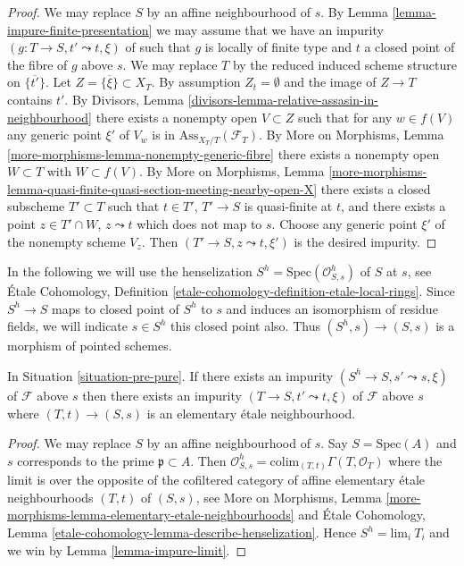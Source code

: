 \begin{proof}
We may replace $S$ by an affine neighbourhood of $s$. By
Lemma \ref{lemma-impure-finite-presentation}
we may assume that we have an impurity $(g : T \to S, t' \leadsto t, \xi)$
of such that $g$ is locally of finite type and $t$ a closed point of the
fibre of $g$ above $s$. We may replace $T$ by the reduced induced
scheme structure on $\overline{\{t'\}}$. Let
$Z = \overline{\{\xi\}} \subset X_T$. By assumption $Z_t = \emptyset$
and the image of $Z \to T$ contains $t'$. By
Divisors, Lemma \ref{divisors-lemma-relative-assasin-in-neighbourhood}
there exists a nonempty open $V \subset Z$ such that for any
$w \in f(V)$ any generic point $\xi'$ of $V_w$ is in
$\text{Ass}_{X_T/T}(\mathcal{F}_T)$. By
More on Morphisms, Lemma \ref{more-morphisms-lemma-nonempty-generic-fibre}
there exists a nonempty open $W \subset T$ with $W \subset f(V)$. By
More on Morphisms, Lemma
\ref{more-morphisms-lemma-quasi-finite-quasi-section-meeting-nearby-open-X}
there exists a closed subscheme $T' \subset T$ such that
$t \in T'$, $T' \to S$ is quasi-finite at $t$, and there exists a point
$z \in T' \cap W$, $z \leadsto t$ which does not map to $s$.
Choose any generic point $\xi'$ of the nonempty scheme $V_z$.
Then $(T' \to S, z \leadsto t, \xi')$ is the desired impurity.
\end{proof}

\noindent
In the following we will use the henselization
$S^h = \text{Spec}(\mathcal{O}_{S, s}^h)$
of $S$ at $s$, see
\'Etale Cohomology,
Definition \ref{etale-cohomology-definition-etale-local-rings}.
Since $S^h \to S$ maps to closed point of $S^h$ to $s$ and
induces an isomorphism of residue fields, we will indicate
$s \in S^h$ this closed point also. Thus $(S^h, s) \to (S, s)$ is
a morphism of pointed schemes.

\begin{lemma}
\label{lemma-impurity-on-henselization}
In Situation \ref{situation-pre-pure}.
If there exists an impurity $(S^h \to S, s' \leadsto s, \xi)$
of $\mathcal{F}$ above $s$ then there exists an impurity
$(T \to S, t' \leadsto t, \xi)$ of $\mathcal{F}$ above $s$
where $(T, t) \to (S, s)$ is an elementary \'etale neighbourhood.
\end{lemma}

\begin{proof}
We may replace $S$ by an affine neighbourhood of $s$.
Say $S = \text{Spec}(A)$ and $s$ corresponds to the prime
$\mathfrak p \subset A$. Then
$\mathcal{O}_{S, s}^h = \text{colim}_{(T, t)} \Gamma(T, \mathcal{O}_T)$
where the limit is over the opposite of the
cofiltered category of affine elementary \'etale neighbourhoods
$(T, t)$ of $(S, s)$, see
More on Morphisms,
Lemma \ref{more-morphisms-lemma-elementary-etale-neighbourhoods}
and
\'Etale Cohomology,
Lemma \ref{etale-cohomology-lemma-describe-henselization}.
Hence $S^h = \text{lim}_i\ T_i$ and we win by
Lemma \ref{lemma-impure-limit}.
\end{proof}

